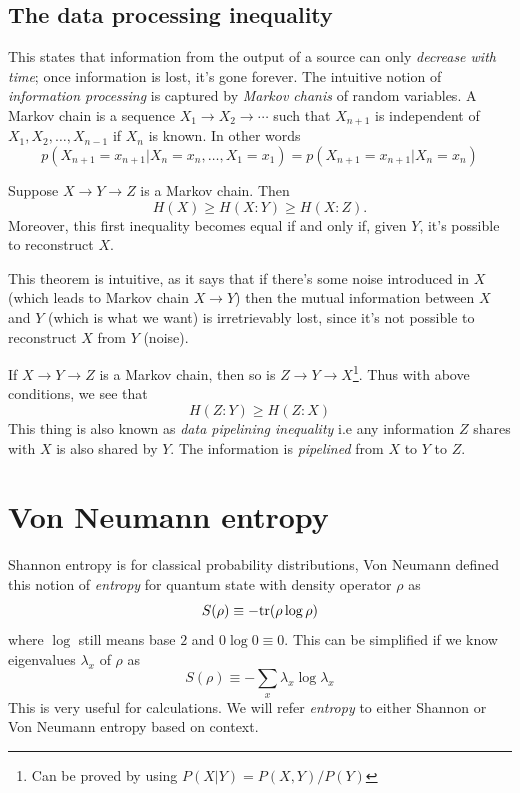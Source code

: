 \subsection{The data processing inequality}
This states that information from the output of a source can only \textit{decrease with time}; once information is lost, it's gone forever. The intuitive notion of \textit{information processing} is captured by \textit{Markov chanis} of random variables. A Markov chain is a sequence $X_1\rightarrow X_2 \rightarrow \cdots$ such that $X_{n+1}$ is independent of $X_1, X_2, \dots, X_{n-1}$ if $X_n$ is known. In other words
\begin{equation}
    p(X_{n+1}=x_{n+1} | X_n = x_n, %
    \dots, X_1 = x_1) = p(X_{n+1}=x_{n+1} | X_n = x_n)
\end{equation}

\begin{theorem}
    Suppose $X\rightarrow Y \rightarrow Z$ is a Markov chain. Then
    \begin{equation}
        H(X) \geq H(X:Y) \geq H(X:Z).
    \end{equation}
    Moreover, this first inequality becomes equal if and only if, given $Y$, it's possible to reconstruct $X$.
\end{theorem}
This theorem is intuitive, as it says that if there's some noise introduced in $X$ (which leads to Markov chain $X\rightarrow Y$) then the mutual information between $X$ and $Y$ (which is what we want) is irretrievably lost, since it's not possible to reconstruct $X$ from $Y$ (noise).

If $X\rightarrow Y \rightarrow Z$ is a Markov chain, then so is $Z\rightarrow Y \rightarrow X$\footnote{Can be proved by using $P(X|Y)=P(X,Y)/P(Y)$}. Thus with above conditions, we see that
\begin{equation}
    H(Z:Y) \geq H(Z:X)
\end{equation}
This thing is also known as \textit{data pipelining inequality} i.e any information $Z$ shares with $X$ is also shared by $Y$. The information is \textit{pipelined} from $X$ to $Y$ to $Z$.

\section{Von Neumann entropy}
Shannon entropy is for classical probability distributions, Von Neumann defined this notion of \textit{entropy} for quantum state with density operator $\rho$ as 
\begin{equation}
    S(\rho) \equiv -\text{tr}(\rho \log{\rho})
\end{equation}
where $\log$ still means base $2$ and $0\log 0 \equiv 0$. This can be simplified if we know eigenvalues $\lambda_x$ of $\rho$ as
\begin{equation}
    S(\rho) \equiv -\sum_x \lambda_x \log{\lambda_x}
\end{equation}
This is very useful for calculations. We will refer \textit{entropy} to either Shannon or Von Neumann entropy based on context.

